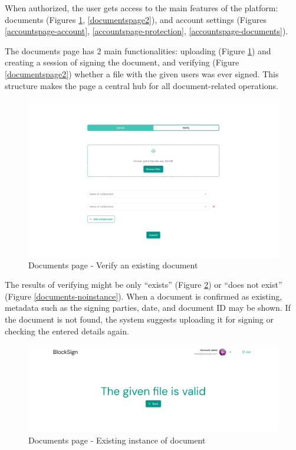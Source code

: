 When authorized, the user gets access to the main features of the platform: documents (Figures \ref{documentspage1}, \ref{documentspage2}), and account settings (Figures \ref{accountspage-account}, \ref{accountspage-protection}, \ref{accountspage-documents}).

The documents page has 2 main functionalities: uploading (Figure \ref{documentspage1}) and creating a session of signing the document, and verifying (Figure \ref{documentspage2}) whether a file with the given users was ever signed. 
This structure makes the page a central hub for all document-related operations. 

\begin{figure}[H]
    \centering
    \includegraphics[width=18cm]{"images/figmaUI/documentspage1-crop.png"}
    \caption{Documents page - Verify an existing document}
    \label{documentspage1}
\end{figure}

The results of verifying might be only ``exists'' (Figure \ref{documents-exists}) or ``does not exist'' (Figure \ref{documents-noinstance}). 
When a document is confirmed as existing, metadata such as the signing parties, date, and document ID may be shown. 
If the document is not found, the system suggests uploading it for signing or checking the entered details again.

\begin{figure}[H]
    \centering
    \includegraphics[width=18cm]{"images/figmaUI/success-crop.png"}
    \caption{Documents page - Existing instance of document}
    \label{documents-exists}
\end{figure}

